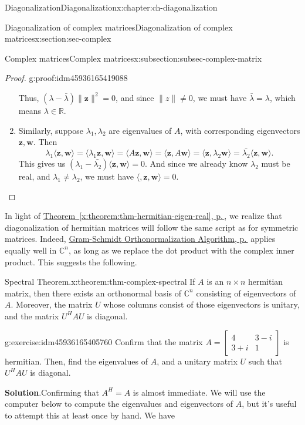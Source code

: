 \documentclass[oneside,10pt,]{book}
\newcommand{\blocktitlefont}{\relax}
\newcommand{\xreffont}{\relax}
\numberwithin{equation}{section}
\newcommand{\bbm}{\begin{bmatrix}}
\newcommand{\ebm}{\end{bmatrix}}
\newcommand{\R}{\mathbb{R}}
\renewcommand{\C}{\mathbb{C}}
\newcommand{\len}[1]{\lVert #1\rVert}
\newcommand{\zz}{\mathbf{z}}
\newcommand{\ww}{\mathbf{w}}
\newcommand{\amp}{&}
\begin{document}
\begin{chapterptx}{Diagonalization}{}{Diagonalization}{}{}{x:chapter:ch-diagonalization}
\begin{sectionptx}{Diagonalization of complex matrices}{}{Diagonalization of complex matrices}{}{}{x:section:sec-complex}
\begin{subsectionptx}{Complex matrices}{}{Complex matrices}{}{}{x:subsection:subsec-complex-matrix}
\begin{proof}{}{g:proof:idm45936165419088}
\begin{enumerate}
\begin{equation*}
\end{equation*}
Thus, \((\lambda-\bar{\lambda})\len{\zz}^2=0\), and since \(\len{z}\neq 0\), we must have \(\bar{\lambda}=\lambda\), which means \(\lambda\in\R\).%
\item{}Similarly, suppose \(\lambda_1,\lambda_2\) are eigenvalues of \(A\), with corresponding eigenvectors \(\zz,\ww\). Then%
\begin{equation*}
\lambda_1\langle \zz,\ww\rangle = \langle \lambda_1\zz,\ww\rangle = \langle A\zz,\ww\rangle =\langle \zz,A\ww\rangle = \langle \zz,\lambda_2\ww\rangle = \bar{\lambda_2}\langle\zz,\ww\rangle\text{.}
\end{equation*}
This gives us \((\lambda_1-\bar{\lambda_2})\langle \zz,\ww\rangle=0\). And since we already know \(\lambda_2\) must be real, and \(\lambda_1\neq \lambda_2\), we must have \(\langle, \zz,\ww\rangle = 0\).%
\end{enumerate}
%
\end{proof}
In light of \hyperref[x:theorem:thm-hermitian-eigen-real]{Theorem~{\xreffont\ref{x:theorem:thm-hermitian-eigen-real}}, p.\,\pageref{x:theorem:thm-hermitian-eigen-real}}, we realize that diagonalization of hermitian matrices will follow the same script as for symmetric matrices. Indeed, \hyperref[x:theorem:thm-gram-schmidt]{Gram-Schmidt Orthonormalization Algorithm, p.\,\pageref{x:theorem:thm-gram-schmidt}} applies equally well in \(\C^n\), as long as we replace the dot product with the complex inner product. This suggests the following.%
\begin{theorem}{Spectral Theorem.}{}{x:theorem:thm-complex-spectral}%
If \(A\) is an \(n\times n\) hermitian matrix, then there exists an orthonormal basis of \(\C^n\) consisting of eigenvectors of \(A\). Moreover, the matrix \(U\) whose columns consist of those eigenvectors is unitary, and the matrix \(U^HAU\) is diagonal.%
\end{theorem}
\begin{inlineexercise}{}{g:exercise:idm45936165405760}%
Confirm that the matrix \(A = \bbm 4 \amp 3-i\\3+i\amp 1\ebm\) is hermitian. Then, find the eigenvalues of \(A\), and a unitary matrix \(U\) such that \(U^HAU\) is diagonal.%
\par\smallskip%
\noindent\textbf{\blocktitlefont Solution}.\label{g:solution:idm45936165400464}{}\hypertarget{g:solution:idm45936165400464}{}\quad{}Confirming that \(A^H=A\) is almost immediate. We will use the computer below to compute the eigenvalues and eigenvectors of \(A\), but it's useful to attempt this at least once by hand. We have%

\end{inlineexercise}
\end{subsectionptx}
\end{sectionptx}
\end{chapterptx}
\end{document}
